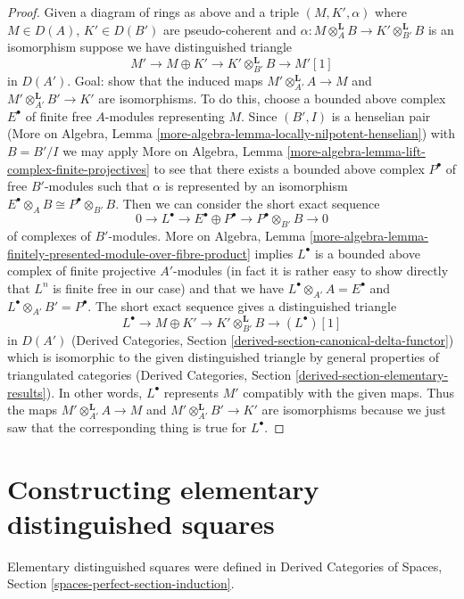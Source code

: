 \begin{proof}
\medskip\noindent
Given a diagram of rings as above and a triple
$(M, K', \alpha)$ where $M \in D(A)$, $K' \in D(B')$ are
pseudo-coherent and
$\alpha : M \otimes_A^\mathbf{L} B \to K' \otimes_{B'}^\mathbf{L} B$
is an isomorphism suppose we have distinguished triangle
$$
M' \to M \oplus K' \to K' \otimes_{B'}^\mathbf{L} B \to M'[1]
$$
in $D(A')$. Goal: show that the induced maps
$M' \otimes_{A'}^\mathbf{L} A \to M$ and
$M' \otimes_{A'}^\mathbf{L} B' \to K'$ are isomorphisms.
To do this, choose a bounded above complex
$E^\bullet$ of finite free $A$-modules representing $M$.
Since $(B', I)$ is a henselian pair
(More on Algebra, Lemma \ref{more-algebra-lemma-locally-nilpotent-henselian})
with $B = B'/I$ we may apply More on Algebra, Lemma
\ref{more-algebra-lemma-lift-complex-finite-projectives}
to see that there exists a bounded above complex $P^\bullet$
of free $B'$-modules such that $\alpha$ is represented
by an isomorphism $E^\bullet \otimes_A B \cong P^\bullet \otimes_{B'} B$.
Then we can consider the short exact sequence
$$
0 \to L^\bullet \to
E^\bullet \oplus P^\bullet \to P^\bullet \otimes_{B'} B \to 0
$$
of complexes of $B'$-modules.
More on Algebra, Lemma
\ref{more-algebra-lemma-finitely-presented-module-over-fibre-product}
implies $L^\bullet$ is a bounded above complex of
finite projective $A'$-modules
(in fact it is rather easy to show directly that $L^n$ is finite free
in our case) and that we have
$L^\bullet \otimes_{A'} A = E^\bullet$ and
$L^\bullet \otimes_{A'} B' = P^\bullet$.
The short exact sequence gives a distinguished triangle
$$
L^\bullet \to M \oplus K' \to K' \otimes_{B'}^\mathbf{L} B \to (L^\bullet)[1]
$$
in $D(A')$ (Derived Categories, Section
\ref{derived-section-canonical-delta-functor}) which is isomorphic
to the given distinguished triangle by general properties of
triangulated categories (Derived Categories, Section
\ref{derived-section-elementary-results}). In other words, $L^\bullet$
represents $M'$ compatibly with the given maps. Thus the maps
$M' \otimes_{A'}^\mathbf{L} A \to M$ and
$M' \otimes_{A'}^\mathbf{L} B' \to K'$ are
isomorphisms because we just saw that the corresponding
thing is true for $L^\bullet$.
\end{proof}

\section{Constructing elementary distinguished squares}
\label{spaces-pushouts-section-elementary-dsitnguished-squares}
Elementary distinguished squares were defined in
Derived Categories of Spaces, Section \ref{spaces-perfect-section-induction}.

